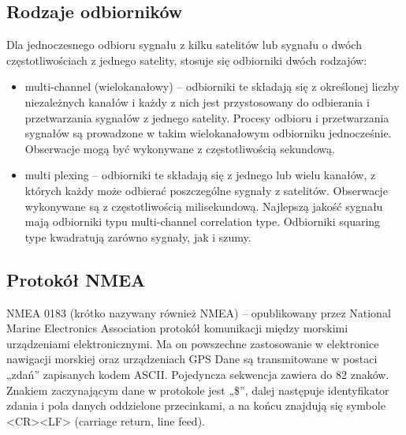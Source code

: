 \documentclass{article}
\begin{document}
\subsection{Rodzaje odbiorników}
Dla jednoczesnego odbioru sygnału z kilku satelitów lub sygnału o dwóch częstotliwościach z jednego satelity, stosuje się odbiorniki dwóch rodzajów:
\begin{itemize}
\item multi-channel (wielokanałowy) – odbiorniki te składają się z określonej liczby niezależnych kanałów i każdy z nich jest przystosowany do odbierania i przetwarzania sygnałów z jednego satelity. Procesy odbioru i przetwarzania sygnałów są prowadzone w takim wielokanałowym odbiorniku jednocześnie. Obserwacje mogą być wykonywane z częstotliwością sekundową.
\item multi plexing – odbiorniki te składają się z jednego lub wielu kanałów, z których każdy może odbierać poszczególne sygnały z satelitów. Obserwacje wykonywane są z częstotliwością milisekundową. Najlepszą jakość sygnału mają odbiorniki typu multi-channel correlation type. Odbiorniki squaring type kwadratują zarówno sygnały, jak i szumy.
\end{itemize}
\subsection{Protokół NMEA}
NMEA 0183 (krótko nazywany również NMEA) – opublikowany przez National Marine Electronics Association protokół komunikacji między morskimi urządzeniami elektronicznymi. Ma on powszechne zastosowanie w elektronice nawigacji morskiej oraz urządzeniach GPS
Dane są transmitowane w postaci „zdań” zapisanych kodem ASCII. Pojedyncza sekwencja zawiera do 82 znaków. Znakiem zaczynającym dane w protokole jest „\$”, dalej następuje identyfikator zdania i pola danych oddzielone przecinkami, a na końcu znajdują się symbole <CR><LF> (carriage return, line feed).
\end{document}
